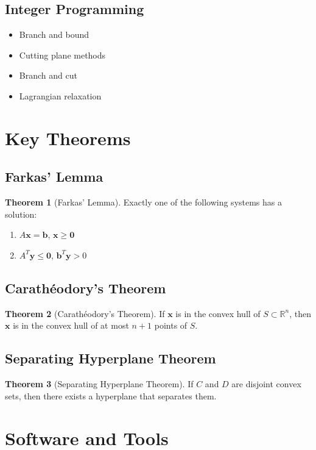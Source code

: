 \documentclass[11pt]{article}
\theoremstyle{definition}
\newtheorem{theorem}{Theorem}[section]
\begin{document}
\subsection{Integer Programming}
\begin{itemize}
    \item Branch and bound
    \item Cutting plane methods
    \item Branch and cut
    \item Lagrangian relaxation
\end{itemize}

\section{Key Theorems}

\subsection{Farkas' Lemma}
\begin{theorem}[Farkas' Lemma]
Exactly one of the following systems has a solution:
\begin{enumerate}
    \item $A\mathbf{x} = \mathbf{b}$, $\mathbf{x} \geq \mathbf{0}$
    \item $A^T \mathbf{y} \leq \mathbf{0}$, $\mathbf{b}^T \mathbf{y} > 0$
\end{enumerate}
\end{theorem}

\subsection{Carathéodory's Theorem}
\begin{theorem}[Carathéodory's Theorem]
If $\mathbf{x}$ is in the convex hull of $S \subset \mathbb{R}^n$, then $\mathbf{x}$ is in the convex hull of at most $n+1$ points of $S$.
\end{theorem}

\subsection{Separating Hyperplane Theorem}
\begin{theorem}[Separating Hyperplane Theorem]
If $C$ and $D$ are disjoint convex sets, then there exists a hyperplane that separates them.
\end{theorem}

\section{Software and Tools}
\end{document}

